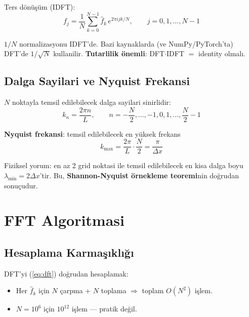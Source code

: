 Ters dönüşüm (IDFT):
\begin{equation}
\boxed{f_j = \frac{1}{N}\sum_{k=0}^{N-1} \hat{f}_k \, e^{2\pi i j k / N}, \qquad j = 0, 1, \ldots, N-1}
\label{eq:idft}
\end{equation}

\begin{remark}
$1/N$ normalizasyonu IDFT'de. Bazi kaynaklarda (ve NumPy/PyTorch'ta) DFT'de $1/\sqrt{N}$ kullanilir. \textbf{Tutarlilik önemli}: DFT$\cdot$IDFT $= $ identity olmalı.
\end{remark}

\subsection{Dalga Sayilari ve Nyquist Frekansi}

$N$ noktayla temsil edilebilecek dalga sayilari sinirlidir:
\begin{equation}
k_n = \frac{2\pi n}{L}, \qquad n = -\frac{N}{2}, \ldots, -1, 0, 1, \ldots, \frac{N}{2} - 1
\label{eq:wavenumbers}
\end{equation}

\textbf{Nyquist frekansi}: temsil edilebilecek en yüksek frekans
\begin{equation}
k_{\max} = \frac{2\pi}{L}\cdot\frac{N}{2} = \frac{\pi}{\Delta x}
\label{eq:nyquist}
\end{equation}

Fiziksel yorum: en az 2 grid noktasi ile temsil edilebilecek en kisa dalga boyu $\lambda_{\min} = 2\Delta x$'tir.
Bu, \textbf{Shannon-Nyquist örnekleme teoremi}nin doğrudan sonuçudur.


\section{FFT Algoritmasi}
\label{sec:fft}

\subsection{Hesaplama Karmaşıklığı}

DFT'yi (\ref{eq:dft}) doğrudan hesaplamak:
\begin{itemize}
\item Her $\hat{f}_k$ için $N$ çarpma + $N$ toplama $\Rightarrow$ toplam $O(N^2)$ işlem.
\item $N = 10^6$ için $10^{12}$ işlem --- pratik değil.
\end{itemize}

